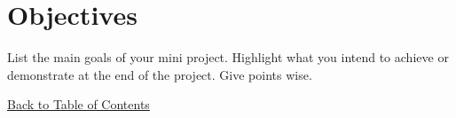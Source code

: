 \section{Objectives}
List the main goals of your mini project. Highlight what you intend to achieve or demonstrate at the end of the project. Give points wise.

\hyperref[contents]{\small Back to Table of Contents}
\newpage
